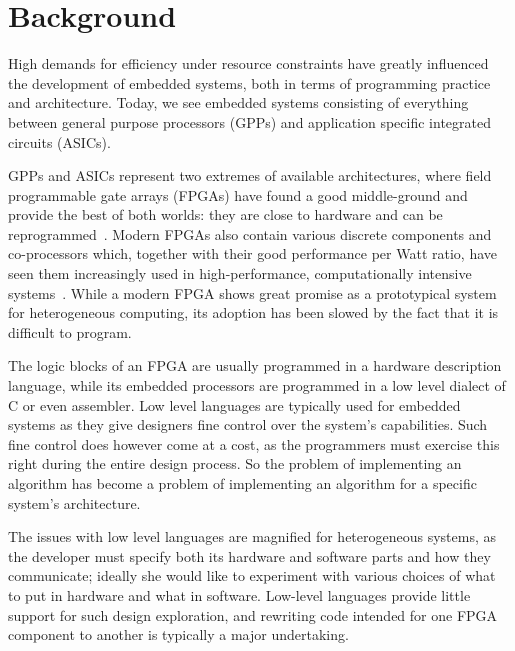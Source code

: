 \documentclass[../paper.tex]{subfiles}
\begin{document}
\chapter{Background}
\label{background}

High demands for efficiency under resource constraints have greatly influenced the development of embedded systems, both in terms of programming practice and architecture. Today, we see embedded systems consisting of everything between general purpose processors (GPPs) and application specific integrated circuits (ASICs).

GPPs and ASICs represent two extremes of available architectures, where field programmable gate arrays (FPGAs) have found a good middle-ground and provide the best of both worlds: they are close to hardware and can be reprogrammed~\cite{bacon2013}. Modern FPGAs also contain various discrete components and co-processors which, together with their good performance per Watt ratio, have seen them increasingly used in high-performance, computationally intensive systems~\cite{mcmillan2014}. While a modern FPGA shows great promise as a prototypical system for heterogeneous computing, its adoption has been slowed by the fact that it is difficult to program.


The logic blocks of an FPGA are usually programmed in a hardware description language, while its embedded processors are programmed in a low level dialect of C or even assembler. Low level languages are typically used for embedded systems as they give designers fine control over the system's capabilities. Such fine control does however come at a cost, as the programmers must exercise this right during the entire design process. So the problem of implementing an algorithm has become a problem of implementing an algorithm for a specific system's architecture.

The issues with low level languages are magnified for heterogeneous systems, as the developer must specify both its hardware and software parts and how they communicate; ideally she would like to experiment with various choices of what to put in hardware and what in software. Low-level languages provide little support for such design exploration, and rewriting code intended for one FPGA component to another is typically a major undertaking.
\end{document}
